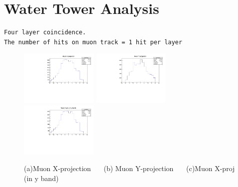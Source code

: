 \documentclass[a4paper,11pt]{article}
\theoremstyle{mytheor}
\begin{document}
\section{Water Tower Analysis} 
\begin{verbatim} 
Four layer coincidence. 
The number of hits on muon track = 1 hit per layer 
\end{verbatim} 
\begin{figure}[H] 
\vspace*{-0.3cm} 
\includegraphics[width=0.33\textwidth,scale=0.5,trim=0 0 0 0,clip]{plotsdir/file0_watertower-muXproj-1.pdf} 
\includegraphics[width=0.33\textwidth,scale=0.5,trim=0 0 0 0,clip]{plotsdir/file0_watertower-muYproj-1.pdf} 
\includegraphics[width=0.33\textwidth,scale=0.5,trim=0 0 0 0,clip]{plotsdir/file0_watertower-muXpr2-1.pdf} 
\caption{(a)Muon X-projection ~~~(b) Muon Y-projection ~~~(c)Muon X-proj (in y band) } 
\end{figure} 
\end{document}
